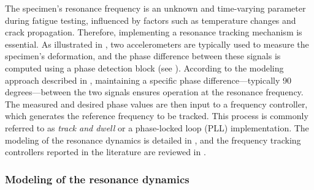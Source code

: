 \documentclass[lettersize,journal]{IEEEtran}
\begin{document}
The specimen’s resonance frequency is an unknown and time-varying parameter during fatigue testing, influenced by factors such as temperature changes and crack propagation. Therefore, implementing a resonance tracking mechanism is essential. As illustrated in , two accelerometers are typically used to measure the specimen’s deformation, and the phase difference between these signals is computed using a phase detection block (see ). According to the modeling approach described in , maintaining a specific phase difference—typically 90 degrees—between the two signals ensures operation at the resonance frequency. The measured and desired phase values are then input to a frequency controller, which generates the reference frequency to be tracked. This process is commonly referred to as {\em track and dwell} or a phase-locked loop (PLL) implementation. The modeling of the resonance dynamics is detailed in , and the frequency tracking controllers reported in the literature are reviewed in .



\subsubsection{Modeling of the resonance dynamics} \label{S_resonance_modeling}
\end{document}
